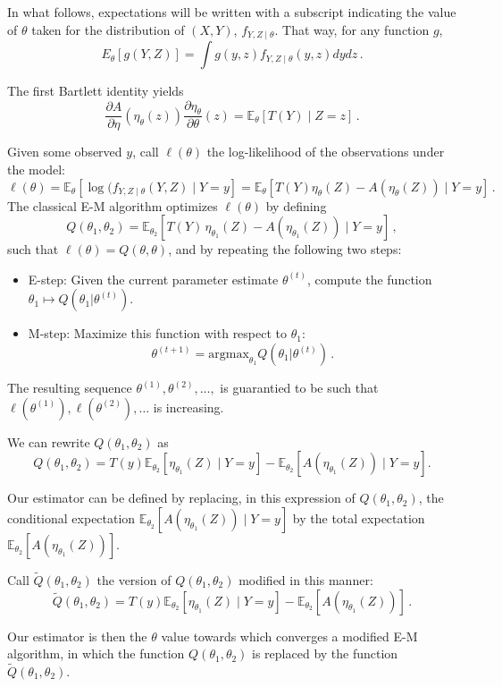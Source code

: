 \documentclass[twoside,11pt]{article}
\newcommand{\fracpartial}[2]{\frac{\partial #1}{\partial  #2}}
\newcommand{\E}{{\mathbb{E}}}
\newcommand{\te}{{\theta}}
\begin{document}
In what follows, expectations will be written with a subscript indicating the value of $\theta$ taken for the distribution of $(X, Y)$, $f_{Y,Z\mid \theta}$. That way, for any function $g$, $$E_\theta\left[g(Y, Z)\right] = \int g(y, z) f_{Y, Z \mid \theta}(y, z)dy dz \,.$$

The first Bartlett identity yields
$$\fracpartial{A}{\eta} \left(\eta_\theta(z)\right) \fracpartial{\eta_\theta}{\theta}(z) = \E_{\theta}\left[T(Y) \mid Z = z\right]\, .$$

Given some observed $y$, call $\ell(\theta)$ the log-likelihood of the observations under the model:
$$\ell(\theta) = \E_{\theta}[ \log(f_{Y, Z\mid \theta}(Y, Z) \mid Y = y ] = \E_{\theta}[ T(Y) \eta_{\theta}(Z) - A(\eta_{\theta}(Z)) \mid Y = y] \, .$$
The classical E-M algorithm optimizes $\ell(\te)$ by defining 
$$Q(\theta_1, \theta_2)  = \E_{\theta_2}\left[ T(Y) \, \eta_{\theta_1}(Z) - A(\eta_{\theta_1}(Z)) \mid Y = y\right] \, ,$$
such that $\ell(\theta) = Q(\theta, \theta)$, 
and by repeating the following two steps: 
\begin{itemize}
    \item E-step: Given the current parameter estimate $\te^{(t)}$, compute the function $\te_1 \mapsto Q(\te_1|\te^{(t)})$.
    \item M-step: Maximize this function with respect to $\te_1$:
    $$\te^{(t+1)} = \textrm{argmax}_{\te_1} Q(\te_1|\te^{(t)}) \, .$$
\end{itemize}
The resulting sequence $\te^{(1)}, \te^{(2)}, \ldots, $ is guarantied to be such that $\ell(\te^{(1)}), \ell(\te^{(2)}), \dots$ is increasing.

We can rewrite $Q(\theta_1, \theta_2)$ as 
$$Q(\theta_1, \theta_2) = T(y) \E_{\theta_2}\left[\eta_{\theta_1}(Z)\mid Y = y \right] - \E_{\theta_2}\left[A(\eta_{\theta_1}(Z)) \mid Y = y\right] .$$

Our estimator can be defined by replacing, in this expression of $Q(\theta_1, \theta_2)$, the conditional expectation $\E_{\theta_2}\left[A(\eta_{\theta_1}(Z)) \mid Y = y \right]$ by the total expectation $\E_{\theta_2}\left[A(\eta_{\theta_1}(Z))\right]$.

Call $\tilde Q(\theta_1, \theta_2)$ the version of $Q(\theta_1, \theta_2)$ modified in this manner:
$$\tilde {Q}(\theta_1, \theta_2) = T(y) \E_{\theta_2}\left[\eta_{\theta_1}(Z)\mid Y = y \right] - \E_{\theta_2}\left[A(\eta_{\theta_1}(Z))\right] \, . $$

Our estimator is then the $\te$ value towards which converges a modified E-M algorithm, in which the function ${Q}(\theta_1, \theta_2)$ is replaced by the function $\tilde {Q}(\theta_1, \theta_2)$.
\end{document}

